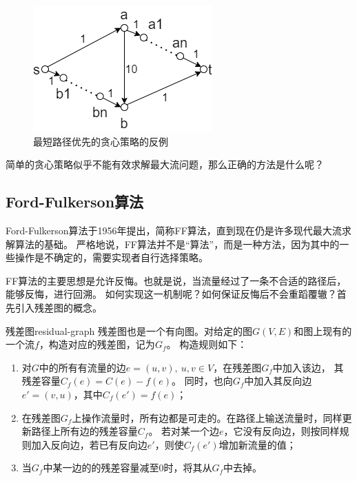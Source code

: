 	\begin{figure}[hbt]
		\centering
		\includegraphics[scale=0.5]{image/network-flow-greedy-example3.png}
		\caption{最短路径优先的贪心策略的反例}\label{fig:max-flow-greedy-fig3}
	\end{figure}

	\par 简单的贪心策略似乎不能有效求解最大流问题，那么正确的方法是什么呢？

\subsection{Ford-Fulkerson算法}

	\par Ford-Fulkerson算法于1956年提出，简称FF算法，直到现在仍是许多现代最大流求解算法的基础。
	严格地说，FF算法并不是“算法”，而是一种方法，因为其中的一些操作是不确定的，需要实现者自行选择策略。
	
	\par FF算法的主要思想是允许反悔。也就是说，当流量经过了一条不合适的路径后，能够反悔，进行回溯。
	如何实现这一机制呢？如何保证反悔后不会重蹈覆辙？首先引入残差图的概念。

\begin{definition}{残差图}{residual-graph}
	残差图也是一个有向图。对给定的图\(G(V,E)\)和图上现有的一个流\(f\)，构造对应的残差图，记为\(G_f\)。
	构造规则如下：
	\begin{enumerate}[(1)]
		\item 对\(G\)中的所有有流量的边\(e=(u,v),\ u,v\in V\)，在残差图\(G_f\)中加入该边，
			其残差容量\(C_f(e)=C(e)-f(e)\)。
			同时，也向\(G_f\)中加入其反向边\(e'=(v,u)\)，其中\(C_f(e')=f(e)\)；
		\item 在残差图\(G_f\)上操作流量时，所有边都是可走的。在路径上输送流量时，同样更新路径上所有边的残差容量\(C_f\)。
			若对某一个边\(e\)，它没有反向边，则按同样规则加入反向边，若已有反向边\(e'\)，则使\(C_f(e')\)增加新流量的值；
		\item 当\(G_f\)中某一边的的残差容量减至0时，将其从\(G_f\)中去掉。
	\end{enumerate}
\end{definition}

